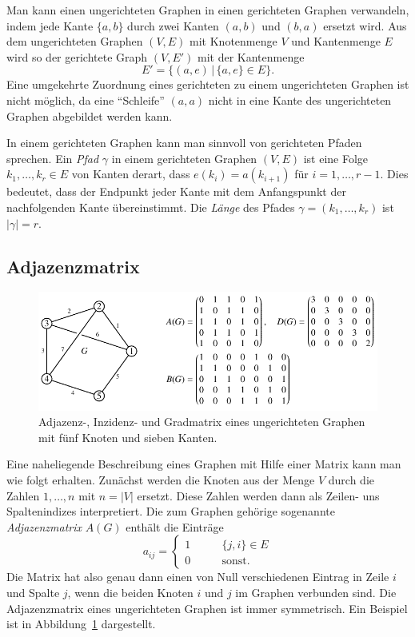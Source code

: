 Man kann einen ungerichteten Graphen in einen gerichteten Graphen
verwandeln, indem jede Kante $\{a,b\}$ durch zwei Kanten 
$(a,b)$ und $(b,a)$ ersetzt wird.
Aus dem ungerichteten Graphen $(V,E)$ mit Knotenmenge $V$ und Kantenmenge
$E$ wird so der gerichtete Graph
$(V,E')$ mit der Kantenmenge
\begin{equation*}
E' 
=
\{
(a,e)
\,|\,
\{a,e\}\in E
\}.
\end{equation*}
Eine umgekehrte Zuordnung eines gerichteten zu einem ungerichteten
Graphen ist nicht möglich, da eine ``Schleife'' $(a,a)$ nicht in eine Kante
des ungerichteten Graphen abgebildet werden kann.

In einem gerichteten Graphen kann man sinnvoll von gerichteten Pfaden
sprechen.
%
Ein {\em Pfad} $\gamma$ in einem gerichteten Graphen $(V,E)$ ist eine Folge
$k_1,\dots,k_r\in E$ von Kanten derart, dass $e(k_i) = a(k_{i+1})$
für $i=1,\dots,r-1$.
Dies bedeutet, dass der Endpunkt jeder Kante mit dem Anfangspunkt der
nachfolgenden Kante übereinstimmt.
Die {\em Länge} des Pfades $\gamma=(k_1,\dots,k_r)$ ist $|\gamma|=r$.

\subsection{Adjazenzmatrix}
\begin{figure}
\centering
\includegraphics{chapters/70-graphen/images/adjazenzu.pdf}
\caption{Adjazenz-, Inzidenz- und Gradmatrix eines ungerichteten
Graphen mit fünf Knoten und sieben Kanten.
\label{buch:graphen:fig:adjazenzu}}
\end{figure}
Eine naheliegende Beschreibung eines Graphen mit Hilfe einer
Matrix kann man wie folgt erhalten.
Zunächst werden die Knoten aus der Menge $V$ durch die Zahlen
$1,\dots,n$ mit $n=|V|$ ersetzt.
Diese Zahlen werden dann als Zeilen- uns Spaltenindizes interpretiert.
Die zum Graphen gehörige sogenannte {\em Adjazenzmatrix} $A(G)$
enthält die Einträge
\begin{equation}
a_{i\!j}
=
\begin{cases}
1&\qquad  \{j,i\} \in E\\
0&\qquad  \text{sonst.}
\end{cases}
\label{buch:graphen:eqn:adjazenzmatrix}
\end{equation}
Die Matrix hat also genau dann einen von Null verschiedenen Eintrag
in Zeile $i$ und Spalte $j$, wenn die beiden Knoten $i$ und $j$
im Graphen verbunden sind.
Die Adjazenzmatrix eines ungerichteten Graphen ist immer symmetrisch.
Ein Beispiel ist in Abbildung~\ref{buch:graphen:fig:adjazenzu}
dargestellt.

